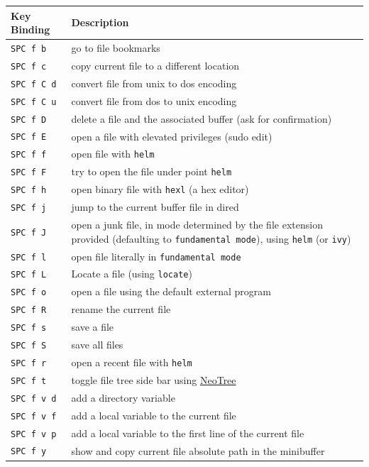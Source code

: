 \documentclass[11pt]{article}
\begin{document}
\begin{enumerate}
\begin{center}
\begin{tabular}{ll}
Key Binding & Description\\
\hline
\texttt{SPC f b} & go to file bookmarks\\
\texttt{SPC f c} & copy current file to a different location\\
\texttt{SPC f C d} & convert file from unix to dos encoding\\
\texttt{SPC f C u} & convert file from dos to unix encoding\\
\texttt{SPC f D} & delete a file and the associated buffer (ask for confirmation)\\
\texttt{SPC f E} & open a file with elevated privileges (sudo edit)\\
\texttt{SPC f f} & open file with \texttt{helm}\\
\texttt{SPC f F} & try to open the file under point \texttt{helm}\\
\texttt{SPC f h} & open binary file with \texttt{hexl} (a hex editor)\\
\texttt{SPC f j} & jump to the current buffer file in dired\\
\texttt{SPC f J} & open a junk file, in mode determined by the file extension provided (defaulting to \texttt{fundamental mode}), using \texttt{helm} (or \texttt{ivy})\\
\texttt{SPC f l} & open file literally in \texttt{fundamental mode}\\
\texttt{SPC f L} & Locate a file (using \texttt{locate})\\
\texttt{SPC f o} & open a file using the default external program\\
\texttt{SPC f R} & rename the current file\\
\texttt{SPC f s} & save a file\\
\texttt{SPC f S} & save all files\\
\texttt{SPC f r} & open a recent file with \texttt{helm}\\
\texttt{SPC f t} & toggle file tree side bar using \href{https://github.com/jaypei/emacs-neotree}{NeoTree}\\
\texttt{SPC f v d} & add a directory variable\\
\texttt{SPC f v f} & add a local variable to the current file\\
\texttt{SPC f v p} & add a local variable to the first line of the current file\\
\texttt{SPC f y} & show and copy current file absolute path in the minibuffer\\
\end{tabular}
\end{center}


\end{enumerate}
\end{document}
